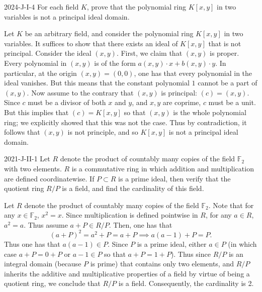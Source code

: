 \documentclass{article}
\begin{document}
	
	\begin{prb}{2024-J-I-4}
		For each field $K$, prove that the polynomial ring $K[x,y]$ in two variables is not a principal ideal domain. 
	\end{prb}
	Let $K$ be an arbitrary field, and consider the polynomial ring $K[x,y]$ in two variables. It suffices to show that there exists an ideal of $K[x,y]$ that is not principal. Consider the ideal $(x, y)$. First, we claim that $(x,y)$ is proper. Every polynomial in $(x,y)$ is of the form $a(x,y)\cdot x + b(x,y) \cdot y$. In particular, at the origin $(x,y) = (0,0)$, one has that every polynomial in the ideal vanishes. But this means that the constant polynomial $1$ cannot be a part of $(x,y)$. Now assume to the contrary that $(x, y)$ is principal: $(c) = (x, y)$. Since $c$ must be a divisor of both $x$ and $y$, and $x, y$ are coprime, $c$ must be a unit. But this implies that $(c) = K[x,y]$ so that $(x,y)$ is the whole polynomial ring; we explicitly showed that this was not the case. Thus by contradiction, it follows that $(x,y)$ is not principle, and so $K[x,y]$ is not a principal ideal domain. 
	
	\begin{prb}{2021-J-II-1}
		Let $R$ denote the product of countably many copies of the field $\mathbb{F}_{2}$ with two elements. $R$ is a commutative ring in which addition and multiplication are defined coordinatewise. If $P \subset R$ is a prime ideal, then verify that the quotient ring $R/P$ is a field, and find the cardinality of this field. 
	\end{prb}
	Let $R$ denote the product of countably many copies of the field $\mathbb{F}_{2}$. Note that for any $x \in \mathbb{F}_{2}$, $x^{2} = x$. Since multiplication is defined pointwise in $R$, for any $a \in R$, $a^{2} = a$. Thus assume $a + P \in R/P$. Then, one has that 
	\begin{equation*}
		(a + P)^{2} = a^{2} + P = a + P \implies a(a - 1) + P = P. 
	\end{equation*}
	Thus one has that $a(a - 1) \in P$. Since $P$ is a prime ideal, either $a \in P$ (in which case $a + P = 0 + P$ or $a - 1 \in P$ so that $a + P = 1 + P$). Thus since $R/P$ is an integral domain (because $P$ is prime) that contains only two elements, and $R/P$ inherits the additive and multiplicative properties of a field by virtue of being a quotient ring, we conclude that $R/P$ is a field. Consequently, the cardinality is 2. 
	
\end{document}
